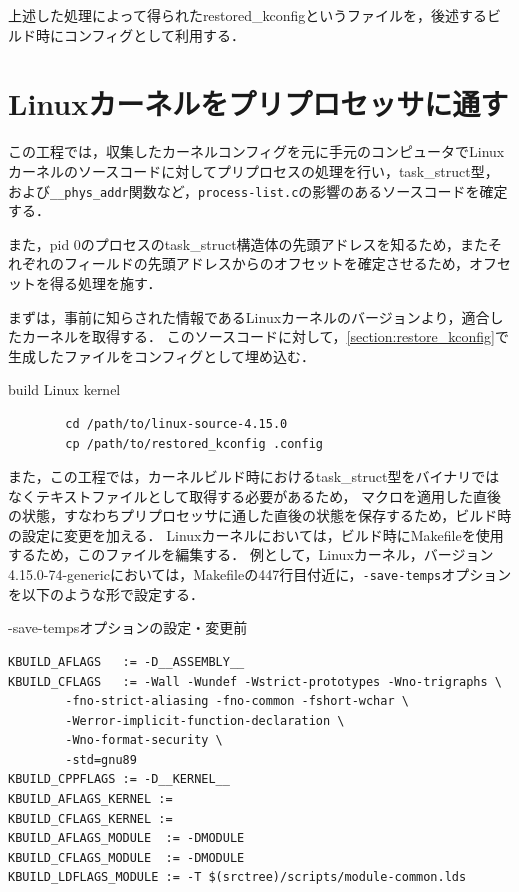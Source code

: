 上述した処理によって得られたrestored_kconfigというファイルを，後述するビルド時にコンフィグとして利用する．

\section{Linuxカーネルをプリプロセッサに通す}
\label{section:preprocess}

この工程では，収集したカーネルコンフィグを元に手元のコンピュータでLinuxカーネルのソースコードに対してプリプロセスの処理を行い，task\_struct型，
および\verb|__phys_addr|関数など，\verb|process-list.c|の影響のあるソースコードを確定する．

また，pid 0のプロセスのtask\_struct構造体の先頭アドレスを知るため，またそれぞれのフィールドの先頭アドレスからのオフセットを確定させるため，オフセットを得る処理を施す．

まずは，事前に知らされた情報であるLinuxカーネルのバージョンより，適合したカーネルを取得する．
このソースコードに対して，\ref{section:restore_kconfig}で生成したファイルをコンフィグとして埋め込む．

\begin{itembox}[l]{build Linux kernel}
    \begin{verbatim}
        cd /path/to/linux-source-4.15.0
        cp /path/to/restored_kconfig .config
    \end{verbatim}
\end{itembox}

また，この工程では，カーネルビルド時におけるtask\_struct型をバイナリではなくテキストファイルとして取得する必要があるため，
マクロを適用した直後の状態，すなわちプリプロセッサに通した直後の状態を保存するため，ビルド時の設定に変更を加える．
Linuxカーネルにおいては，ビルド時にMakefileを使用するため，このファイルを編集する．
例として，Linuxカーネル，バージョン4.15.0-74-genericにおいては，Makefileの447行目付近に，\verb|-save-temps|オプションを以下のような形で設定する．

\begin{itembox}[l]{-save-tempsオプションの設定・変更前}
    \begin{verbatim}
KBUILD_AFLAGS   := -D__ASSEMBLY__
KBUILD_CFLAGS   := -Wall -Wundef -Wstrict-prototypes -Wno-trigraphs \
        -fno-strict-aliasing -fno-common -fshort-wchar \
        -Werror-implicit-function-declaration \
        -Wno-format-security \
        -std=gnu89
KBUILD_CPPFLAGS := -D__KERNEL__
KBUILD_AFLAGS_KERNEL :=
KBUILD_CFLAGS_KERNEL :=
KBUILD_AFLAGS_MODULE  := -DMODULE
KBUILD_CFLAGS_MODULE  := -DMODULE
KBUILD_LDFLAGS_MODULE := -T $(srctree)/scripts/module-common.lds
    \end{verbatim}
\end{itembox}

